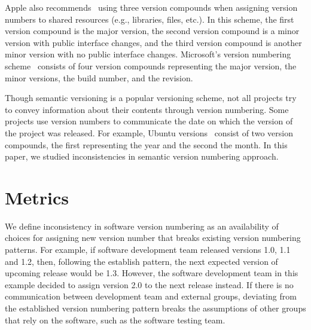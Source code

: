 \documentclass[conference]{IEEEtran}
\begin{document}
Apple also recommends~\cite{AppleVersionNumbering} using three version compounds when assigning version numbers to shared resources (e.g., libraries, files, etc.).
In this scheme, the first version compound is the major version, the second version compound is a minor version with public interface changes, and the third version compound is another minor version with no public interface changes.
Microsoft's  version numbering scheme~\cite{MSVersionNumbering} consists of four version compounds representing the major version, the minor versions, the build number, and the revision.



Though semantic versioning is a popular versioning scheme, not all projects try to convey information about their contents through version numbering. 
Some projects use version numbers to communicate the date on which the version of the project was released. 
For example, Ubuntu versions~\cite{UbuntuVersionNumbering} consist of two version compounds, the first representing the year and the second the month.
In this paper, we studied inconsistencies in semantic version numbering approach.

\section{Metrics}

We define inconsistency in software version numbering as an availability of choices for assigning new version number that breaks existing version numbering patterns. 
For example, if software development team released versions 1.0, 1.1 and 1.2, then, following the establish pattern, the next expected version of upcoming release would be 1.3. 
However,  the software development team in this example decided to assign version 2.0 to the next release instead.
If there is no communication between development team and external groups, deviating from the established version numbering pattern breaks the assumptions of other groups that rely on the software, such as the software testing team.
\end{document}
